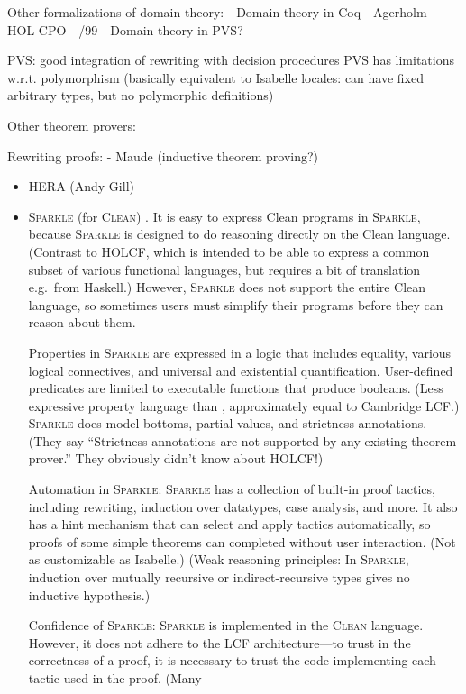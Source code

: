 Other formalizations of domain theory:
- Domain theory in Coq
- Agerholm HOL-CPO
- /99
- Domain theory in PVS?

PVS: good integration of rewriting with decision procedures
PVS has limitations w.r.t. polymorphism (basically equivalent to Isabelle locales: can have fixed arbitrary types, but no polymorphic definitions)

Other theorem provers:

Rewriting proofs:
- Maude (inductive theorem proving?)

\begin{itemize}

\item HERA (Andy Gill) \cite{Gill06HERA}

\item \textsc{Sparkle} (for \textsc{Clean}) \cite{Mol01}. It is easy to express Clean programs in \textsc{Sparkle}, because \textsc{Sparkle} is designed to do reasoning directly on the Clean language. (Contrast to HOLCF, which is intended to be able to express a common subset of various functional languages, but requires a bit of translation e.g.\ from Haskell.) However, \textsc{Sparkle} does not support the entire Clean language, so sometimes users must simplify their programs before they can reason about them.

Properties in \textsc{Sparkle} are expressed in a logic that includes equality, various logical connectives, and universal and existential quantification. User-defined predicates are limited to executable functions that produce booleans. (Less expressive property language than , approximately equal to Cambridge LCF.) \textsc{Sparkle} does model bottoms, partial values, and strictness annotations. (They say ``Strictness annotations are not supported by any existing theorem prover.'' They obviously didn't know about HOLCF!)

Automation in \textsc{Sparkle}: \textsc{Sparkle} has a collection of built-in proof tactics, including rewriting, induction over datatypes, case analysis, and more. It also has a hint mechanism that can select and apply tactics automatically, so proofs of some simple theorems can completed without user interaction. (Not as customizable as Isabelle.) (Weak reasoning principles: In \textsc{Sparkle}, induction over mutually recursive or indirect-recursive types gives no inductive hypothesis.)

Confidence of \textsc{Sparkle}: \textsc{Sparkle} is implemented in the \textsc{Clean} language. However, it does not adhere to the LCF architecture---to trust in the correctness of a proof, it is necessary to trust the code implementing each tactic used in the proof. (Many 


\end{itemize}
